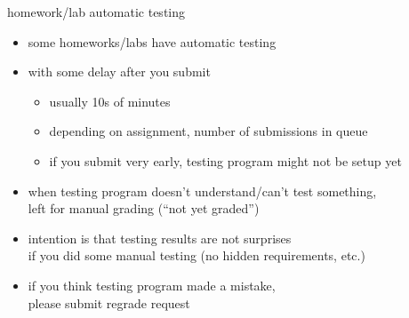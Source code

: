 \begin{frame}{homework/lab automatic testing}
    \begin{itemize}
    \item some homeworks/labs have automatic testing
    \item with some delay after you submit
        \begin{itemize}
        \item usually 10s of minutes
        \item depending on assignment, number of submissions in queue
        \item if you submit very early, testing program might not be setup yet
        \end{itemize}
    \item when testing program doesn't understand/can't test something, \\
        left for manual grading (``not yet graded'')
    \item intention is that testing results are not surprises \\
        if you did some manual testing (no hidden requirements, etc.)
    \item if you think testing program made a mistake, \\
        please submit regrade request
    \end{itemize}
\end{frame}

